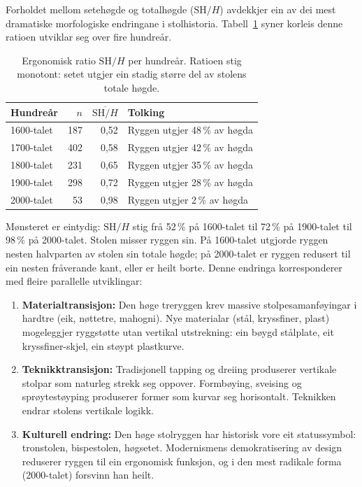 \documentclass[10pt, a4paper, twocolumn]{article}
\begin{document}
Forholdet mellom setehøgde og totalhøgde ($\text{SH}/H$) avdekkjer ein av dei mest dramatiske morfologiske endringane i stolhistoria. Tabell~\ref{tab:sh_ratio} syner korleis denne ratioen utviklar seg over fire hundreår.

\begin{table}[H]
\centering
\caption{Ergonomisk ratio $\text{SH}/H$ per hundreår. Ratioen stig monotont: setet utgjer ein stadig større del av stolens totale høgde.}
\label{tab:sh_ratio}
\begin{tabular}{@{}lrrl@{}}
\toprule
\textbf{Hundreår} & \textbf{$n$} & \textbf{$\overline{\text{SH}/H}$} & \textbf{Tolking} \\
\midrule
1600-talet & 187 & 0,52 & Ryggen utgjer 48\,\% av høgda \\
1700-talet & 402 & 0,58 & Ryggen utgjer 42\,\% av høgda \\
1800-talet & 231 & 0,65 & Ryggen utgjer 35\,\% av høgda \\
1900-talet & 298 & 0,72 & Ryggen utgjer 28\,\% av høgda \\
2000-talet & 53 & 0,98 & Ryggen utgjer 2\,\% av høgda \\
\bottomrule
\end{tabular}
\end{table}

Mønsteret er eintydig: $\text{SH}/H$ stig frå 52\,\% på 1600-talet til 72\,\% på 1900-talet til 98\,\% på 2000-talet. Stolen misser ryggen sin. På 1600-talet utgjorde ryggen nesten halvparten av stolen sin totale høgde; på 2000-talet er ryggen redusert til ein nesten fråverande kant, eller er heilt borte. Denne endringa korresponderer med fleire parallelle utviklingar:

\begin{enumerate}
  \item \textbf{Materialtransisjon:} Den høge treryggen krev massive stolpesamanføyingar i hardtre (eik, nøttetre, mahogni). Nye materialar (stål, kryssfiner, plast) mogeleggjer ryggstøtte utan vertikal utstrekning: ein bøygd stålplate, eit kryssfiner-skjel, ein støypt plastkurve.

  \item \textbf{Teknikktransisjon:} Tradisjonell tapping og dreiing produserer vertikale stolpar som naturleg strekk seg oppover. Formbøying, sveising og sprøytestøyping produserer former som kurvar seg horisontalt. Teknikken endrar stolens vertikale logikk.

  \item \textbf{Kulturell endring:} Den høge stolryggen har historisk vore eit statussymbol: tronstolen, bispestolen, høgsetet. Modernismens demokratisering av design reduserer ryggen til ein ergonomisk funksjon, og i den mest radikale forma (2000-talet) forsvinn han heilt.
\end{enumerate}
\end{document}
